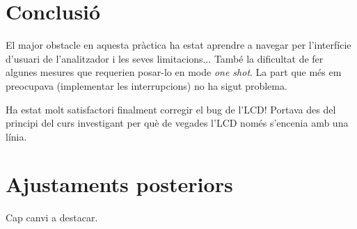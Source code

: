 \section{Conclusió}

El major obstacle en aquesta pràctica ha estat aprendre a navegar per l'interfície d'usuari
de l'analitzador i les seves limitacions... També la dificultat de fer algunes mesures
que requerien posar-lo en mode \emph{one shot}. La part que més em preocupava (implementar
les interrupcions) no ha sigut problema.

Ha estat molt satisfactori finalment corregir el bug de l'LCD!
Portava des del principi del curs investigant per què de vegades l'LCD només s'encenia amb una línia.

\section{Ajustaments posteriors}

Cap canvi a destacar.
